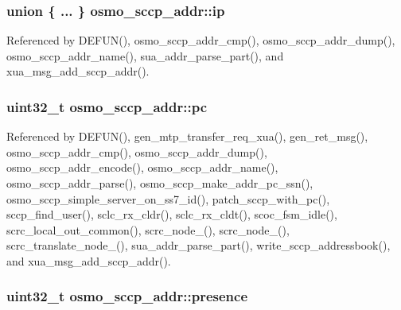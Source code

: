 \subsubsection[{ip}]{\setlength{\rightskip}{0pt plus 5cm}union \{ ... \}   osmo\+\_\+sccp\+\_\+addr\+::ip}\label{structosmo__sccp__addr_a0d3d9e92848c7fd65c131d3d9f3386df}


Referenced by D\+E\+F\+U\+N(), osmo\+\_\+sccp\+\_\+addr\+\_\+cmp(), osmo\+\_\+sccp\+\_\+addr\+\_\+dump(), osmo\+\_\+sccp\+\_\+addr\+\_\+name(), sua\+\_\+addr\+\_\+parse\+\_\+part(), and xua\+\_\+msg\+\_\+add\+\_\+sccp\+\_\+addr().

\subsubsection[{pc}]{\setlength{\rightskip}{0pt plus 5cm}uint32\+\_\+t osmo\+\_\+sccp\+\_\+addr\+::pc}\label{structosmo__sccp__addr_a06b7f9d5c79fc812b02523b23d6b85b9}


Referenced by D\+E\+F\+U\+N(), gen\+\_\+mtp\+\_\+transfer\+\_\+req\+\_\+xua(), gen\+\_\+ret\+\_\+msg(), osmo\+\_\+sccp\+\_\+addr\+\_\+cmp(), osmo\+\_\+sccp\+\_\+addr\+\_\+dump(), osmo\+\_\+sccp\+\_\+addr\+\_\+encode(), osmo\+\_\+sccp\+\_\+addr\+\_\+name(), osmo\+\_\+sccp\+\_\+addr\+\_\+parse(), osmo\+\_\+sccp\+\_\+make\+\_\+addr\+\_\+pc\+\_\+ssn(), osmo\+\_\+sccp\+\_\+simple\+\_\+server\+\_\+on\+\_\+ss7\+\_\+id(), patch\+\_\+sccp\+\_\+with\+\_\+pc(), sccp\+\_\+find\+\_\+user(), sclc\+\_\+rx\+\_\+cldr(), sclc\+\_\+rx\+\_\+cldt(), scoc\+\_\+fsm\+\_\+idle(), scrc\+\_\+local\+\_\+out\+\_\+common(), scrc\+\_\+node\+\_(), scrc\+\_\+node\+\_(), scrc\+\_\+translate\+\_\+node\+\_(), sua\+\_\+addr\+\_\+parse\+\_\+part(), write\+\_\+sccp\+\_\+addressbook(), and xua\+\_\+msg\+\_\+add\+\_\+sccp\+\_\+addr().

\subsubsection[{presence}]{\setlength{\rightskip}{0pt plus 5cm}uint32\+\_\+t osmo\+\_\+sccp\+\_\+addr\+::presence}\label{structosmo__sccp__addr_acd24f97487b7e3beb2f7da2619919ac6}


